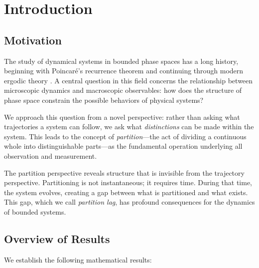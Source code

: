 \documentclass[twocolumn,10pt,a4paper]{article}
\theoremstyle{definition}
\theoremstyle{remark}
\begin{document}
\section{Introduction}
\label{sec:introduction}

\subsection{Motivation}

The study of dynamical systems in bounded phase spaces has a long history, beginning with Poincar\'{e}'s recurrence theorem \cite{poincare1890} and continuing through modern ergodic theory \cite{walters1982,katok1995}. A central question in this field concerns the relationship between microscopic dynamics and macroscopic observables: how does the structure of phase space constrain the possible behaviors of physical systems?

We approach this question from a novel perspective: rather than asking what trajectories a system can follow, we ask what \emph{distinctions} can be made within the system. This leads to the concept of \emph{partition}---the act of dividing a continuous whole into distinguishable parts---as the fundamental operation underlying all observation and measurement.

The partition perspective reveals structure that is invisible from the trajectory perspective. Partitioning is not instantaneous; it requires time. During that time, the system evolves, creating a gap between what is partitioned and what exists. This gap, which we call \emph{partition lag}, has profound consequences for the dynamics of bounded systems.

\subsection{Overview of Results}

We establish the following mathematical results:
\end{document}

